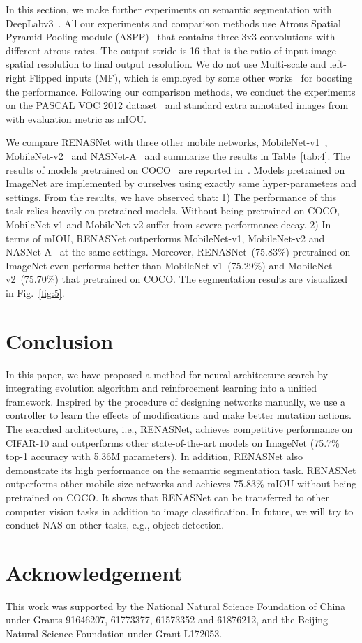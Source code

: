 \documentclass[10pt,twocolumn,letterpaper]{article}
\begin{document}
In this section, we make further experiments on semantic segmentation with DeepLabv3~\cite{deeplab-v3}. All our experiments and comparison methods use Atrous Spatial Pyramid Pooling module (ASPP)~\cite{deeplab-v2} that contains three 3x3 convolutions with different atrous rates. 
The output stride is 16 that is the ratio of input image spatial resolution to final output resolution. We do not use Multi-scale and left-right Flipped inputs (MF), which is employed by some other works~\cite{sandler2018inverted} for boosting the performance. Following our comparison methods, we conduct the experiments on the PASCAL VOC 2012 dataset~\cite{PascalVOC} and standard extra annotated images from \cite{extraImage} with evaluation metric as mIOU.
 
 We compare RENASNet with three other mobile networks, MobileNet-v1~\cite{howard2017mobilenets}, MobileNet-v2~\cite{sandler2018inverted} and NASNet-A~\cite{zoph2017learning} and summarize the results in Table~\ref{tab:4}. The results of models pretrained on COCO~\cite{COCO} are reported in~\cite{sandler2018inverted}. Models pretrained on ImageNet are implemented by ourselves using exactly same hyper-parameters and settings.
 From the results, we have observed that: 1) The performance of this task relies heavily on pretrained models.  Without being pretrained on COCO, MobileNet-v1 and MobileNet-v2 suffer from severe performance decay. 2) In terms of mIOU, RENASNet outperforms MobileNet-v1, MobileNet-v2 and NASNet-A~\cite{howard2017mobilenets} at the same settings. Moreover, RENASNet~(75.83\%) pretrained on ImageNet even performs better than MobileNet-v1~(75.29\%) and MobileNet-v2~(75.70\%) that pretrained on COCO. The segmentation results are visualized in Fig.~\ref{fig:5}.

\section{Conclusion}
In this paper, we have proposed a method for neural architecture search by integrating evolution algorithm and reinforcement learning into a unified framework. Inspired by the procedure of designing networks manually, we use a controller to learn the effects of modifications and make better mutation actions. The searched architecture, i.e., RENASNet, achieves competitive performance on CIFAR-10 and outperforms other state-of-the-art models on ImageNet (75.7\% top-1 accuracy with 5.36M parameters). 
In addition, RENASNet also demonstrate its high performance on the semantic segmentation task. RENASNet outperforms other mobile size networks and achieves 75.83\% mIOU without being pretrained on COCO. It shows that RENASNet can be transferred to other computer vision tasks in addition to image classification. In future, we will try to conduct NAS on other tasks, e.g., object detection.

\section*{Acknowledgement}
 This work was supported by the National Natural Science Foundation of China under Grants 91646207, 61773377,  61573352 and 61876212, and the Beijing Natural Science Foundation under Grant L172053.

{\small


}
\end{document}
